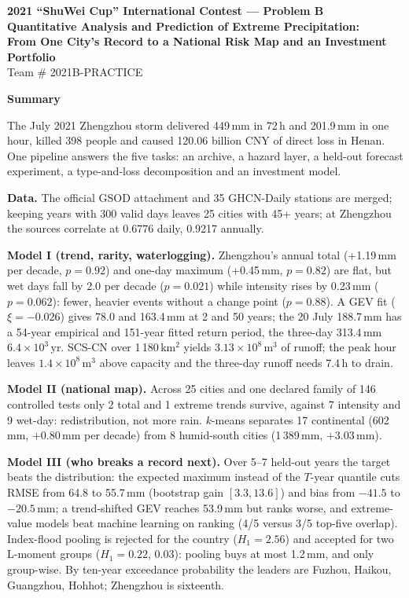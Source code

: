 \begin{center}
{\large\bfseries 2021 ``ShuWei Cup'' International Contest --- Problem B}\\[3pt]
{\large\bfseries Quantitative Analysis and Prediction of Extreme Precipitation:\\[0pt]
From One City's Record to a National Risk Map and an Investment Portfolio}\\[2pt]
{\normalsize Team \# 2021B-PRACTICE}
\end{center}

\enlargethispage{2\baselineskip}

\noindent\textbf{Summary}

The July 2021 Zhengzhou storm delivered 449\,mm in 72\,h and 201.9\,mm in one hour, killed 398 people and caused 120.06 billion CNY of direct loss in Henan. One pipeline answers the five tasks: an archive, a hazard layer, a held-out forecast experiment, a type-and-loss decomposition and an investment model.

\textbf{Data.} The official GSOD attachment and 35 GHCN-Daily stations are merged; keeping years with 300 valid days leaves 25 cities with 45+ years; at Zhengzhou the sources correlate at 0.6776 daily, 0.9217 annually.

\textbf{Model I (trend, rarity, waterlogging).} Zhengzhou's annual total (+1.19\,mm per decade, $p=0.92$) and one-day maximum (+0.45\,mm, $p=0.82$) are flat, but wet days fall by 2.0 per decade ($p=0.021$) while intensity rises by 0.23\,mm ($p=0.062$): fewer, heavier events without a change point ($p=0.88$). A GEV fit ($\xi=-0.026$) gives 78.0 and 163.4\,mm at 2 and 50 years; the 20 July 188.7\,mm has a 54-year empirical and 151-year fitted return period, the three-day 313.4\,mm $6.4\times10^{3}$\,yr. SCS-CN over 1\,180\,km$^2$ yields $3.13\times10^{8}$\,m$^3$ of runoff; the peak hour leaves $1.4\times10^{8}$\,m$^3$ above capacity and the three-day runoff needs 7.4\,h to drain.

\textbf{Model II (national map).} Across 25 cities and one declared family of 146 controlled tests only 2 total and 1 extreme trends survive, against 7 intensity and 9 wet-day: redistribution, not more rain. $k$-means separates 17 continental (602\,mm, $+0.80$\,mm per decade) from 8 humid-south cities (1\,389\,mm, $+3.03$\,mm).

\textbf{Model III (who breaks a record next).} Over 5--7 held-out years the target beats the distribution: the expected maximum instead of the $T$-year quantile cuts RMSE from 64.8 to 55.7\,mm (bootstrap gain $[3.3,13.6]$) and bias from $-41.5$ to $-20.5$\,mm; a trend-shifted GEV reaches 53.9\,mm but ranks worse, and extreme-value models beat machine learning on ranking (4/5 versus 3/5 top-five overlap). Index-flood pooling is rejected for the country ($H_1=2.56$) and accepted for two L-moment groups ($H_1=0.22$, $0.03$): pooling buys at most 1.2\,mm, and only group-wise. By ten-year exceedance probability the leaders are Fuzhou, Haikou, Guangzhou, Hohhot; Zhengzhou is sixteenth.


